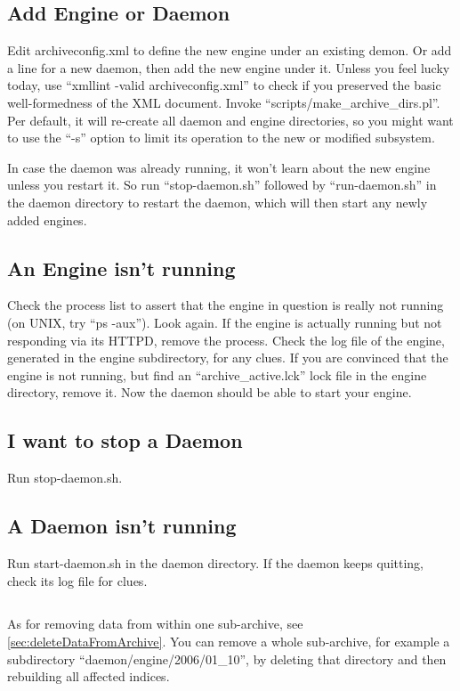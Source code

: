 \subsection{Add Engine or Daemon}
Edit archiveconfig.xml to define the new engine under an existing
demon. Or add a line for a new daemon, then add the new engine under
it.  Unless you feel lucky today, use ``xmllint -valid
archiveconfig.xml'' to check if you preserved the basic
well-formedness of the XML document. Invoke
``scripts/make\_archive\_dirs.pl''. Per default, it will re-create all
daemon and engine directories, so you might want to use the ``-s''
option to limit its operation to the new or modified subsystem.

In case the daemon was already running, it won't learn about the new
engine unless you restart it. So run ``stop-daemon.sh'' followed by
``run-daemon.sh'' in the daemon directory to restart
the daemon, which will then start any newly added engines.

\subsection{An Engine isn't running}
Check the process list to assert that the engine in question is really not
running (on UNIX, try ``ps -aux''). Look again. If the engine is
actually running but not responding via its HTTPD, remove the process.
Check the log file of the engine, generated in the engine
subdirectory, for any clues. If you are convinced that the engine is
not running, but find an ``archive\_active.lck'' lock file in the
engine directory, remove it. Now the daemon should be able to start
your engine.  

\subsection{I want to stop a Daemon}
Run stop-daemon.sh.

\subsection{A Daemon isn't running}
Run start-daemon.sh in the daemon directory. If the daemon keeps quitting,
check its log file for clues.

\subsection{}
As for removing data from within one sub-archive, see 
\ref{sec:deleteDataFromArchive}.
You can remove a whole sub-archive, for example a subdirectory
``daemon/engine/2006/01\_10'', by deleting that directory and then rebuilding
all affected indices.

